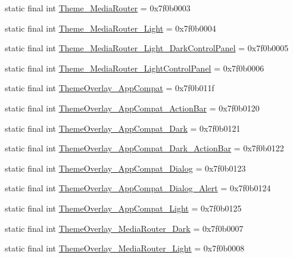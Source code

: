 \begin{CompactItemize}
\item 
static final int \hyperlink{classandroid_1_1support_1_1fragment_1_1_r_1_1style_ac7f6069b6cf7af3a72ca068581decc1}{Theme\_\-MediaRouter} = 0x7f0b0003
\item 
static final int \hyperlink{classandroid_1_1support_1_1fragment_1_1_r_1_1style_3f3f08dad69389287420b4699d6681f4}{Theme\_\-MediaRouter\_\-Light} = 0x7f0b0004
\item 
static final int \hyperlink{classandroid_1_1support_1_1fragment_1_1_r_1_1style_affcda07739d78784816ad8d137fc039}{Theme\_\-MediaRouter\_\-Light\_\-DarkControlPanel} = 0x7f0b0005
\item 
static final int \hyperlink{classandroid_1_1support_1_1fragment_1_1_r_1_1style_1013613e9fb461b831949865609236f9}{Theme\_\-MediaRouter\_\-LightControlPanel} = 0x7f0b0006
\item 
static final int \hyperlink{classandroid_1_1support_1_1fragment_1_1_r_1_1style_1d16c373df2e06911b432b822e7b3273}{ThemeOverlay\_\-AppCompat} = 0x7f0b011f
\item 
static final int \hyperlink{classandroid_1_1support_1_1fragment_1_1_r_1_1style_4733da41714de505aa8cc912e54b4748}{ThemeOverlay\_\-AppCompat\_\-ActionBar} = 0x7f0b0120
\item 
static final int \hyperlink{classandroid_1_1support_1_1fragment_1_1_r_1_1style_d5cb712093987b7d2f8a744e89f9598b}{ThemeOverlay\_\-AppCompat\_\-Dark} = 0x7f0b0121
\item 
static final int \hyperlink{classandroid_1_1support_1_1fragment_1_1_r_1_1style_7f92e0870d27f54921b77dfc810380f7}{ThemeOverlay\_\-AppCompat\_\-Dark\_\-ActionBar} = 0x7f0b0122
\item 
static final int \hyperlink{classandroid_1_1support_1_1fragment_1_1_r_1_1style_278a423d4447567d0474011441407651}{ThemeOverlay\_\-AppCompat\_\-Dialog} = 0x7f0b0123
\item 
static final int \hyperlink{classandroid_1_1support_1_1fragment_1_1_r_1_1style_8ffde48cbebc1732cd8ddc72bc372fcf}{ThemeOverlay\_\-AppCompat\_\-Dialog\_\-Alert} = 0x7f0b0124
\item 
static final int \hyperlink{classandroid_1_1support_1_1fragment_1_1_r_1_1style_663eb3ca17dbd38008d0316f7cd4c76b}{ThemeOverlay\_\-AppCompat\_\-Light} = 0x7f0b0125
\item 
static final int \hyperlink{classandroid_1_1support_1_1fragment_1_1_r_1_1style_c477ce4afa7229be892f6a71aa4040e1}{ThemeOverlay\_\-MediaRouter\_\-Dark} = 0x7f0b0007
\item 
static final int \hyperlink{classandroid_1_1support_1_1fragment_1_1_r_1_1style_25782c11ebbe8ec9d80044a538b04233}{ThemeOverlay\_\-MediaRouter\_\-Light} = 0x7f0b0008

\end{CompactItemize}

